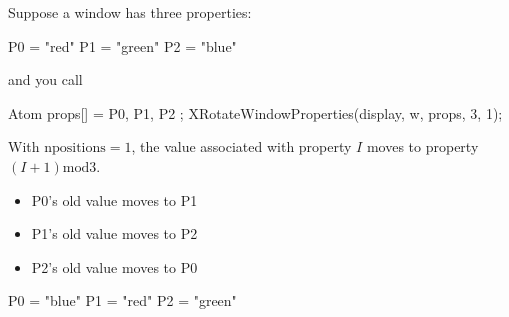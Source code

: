 \documentclass{report}
\begin{document}
\begin{itemize}
        \bigbreak \noindent 
        Suppose a window has three properties:
        \bigbreak \noindent 
        \begin{cppcode}
            P0 = "red"
            P1 = "green"
            P2 = "blue"
        \end{cppcode}
        \bigbreak \noindent 
        and you call
        \bigbreak \noindent 
        \begin{cppcode}
            Atom props[] = { P0, P1, P2 };
            XRotateWindowProperties(display, w, props, 3, 1);
        \end{cppcode}
        \bigbreak \noindent 
        With $\text{npositions} = 1$, the value associated with property $I$ moves to property $(I + 1) \text{mod} 3$.
        \bigbreak \noindent 
        \begin{itemize}
            \item P0's old value moves to P1
            \item P1's old value moves to P2
            \item P2's old value moves to P0
        \end{itemize}
        \begin{cppcode}
            P0 = "blue"
            P1 = "red"
            P2 = "green"
        \end{cppcode}


\end{itemize}
\end{document}
